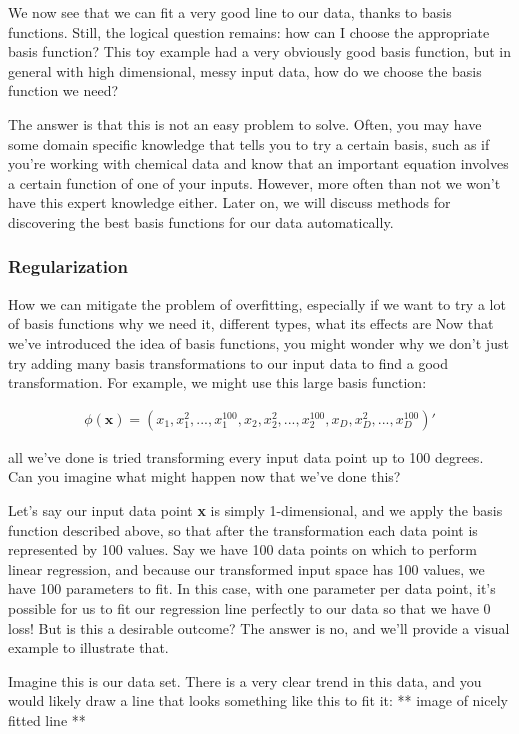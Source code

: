 We now see that we can fit a very good line to our data, thanks to basis functions. Still, the logical question remains: how can I choose the appropriate basis function? This toy example had a very obviously good basis function, but in general with high dimensional, messy input data, how do we choose the basis function we need?

The answer is that this is not an easy problem to solve. Often, you may have some domain specific knowledge that tells you to try a certain basis, such as if you're working with chemical data and know that an important equation involves a certain function of one of your inputs. However, more often than not we won't have this expert knowledge either. Later on, we will discuss methods for discovering the best basis functions for our data automatically.

\subsubsection{Regularization}
How we can mitigate the problem of overfitting, especially if we want to try a lot of basis functions
why we need it, different types, what its effects are
Now that we've introduced the idea of basis functions, you might wonder why we don't just try adding many basis transformations to our input data to find a good transformation. For example, we might use this large basis function:

\begin{align*}
    \phi(\textbf{x}) = (x_{1}, x_{1}^{2}, ..., x_{1}^{100}, x_{2}, x_{2}^{2}, ..., x_{2}^{100}, x_{D}, x_{D}^{2}, ..., x_{D}^{100})'
\end{align*}

all we've done is tried transforming every input data point up to 100 degrees. Can you imagine what might happen now that we've done this?

Let's say our input data point \textbf{x} is simply 1-dimensional, and we apply the basis function described above, so that after the transformation each data point is represented by 100 values. Say we have 100 data points on which to perform linear regression, and because our transformed input space has 100 values, we have 100 parameters to fit. In this case, with one parameter per data point, it's possible for us to fit our regression line perfectly to our data so that we have 0 loss! But is this a desirable outcome? The answer is no, and we'll provide a visual example to illustrate that.

Imagine this is our data set. There is a very clear trend in this data, and you would likely draw a line that looks something like this to fit it:
** image of nicely fitted line **

